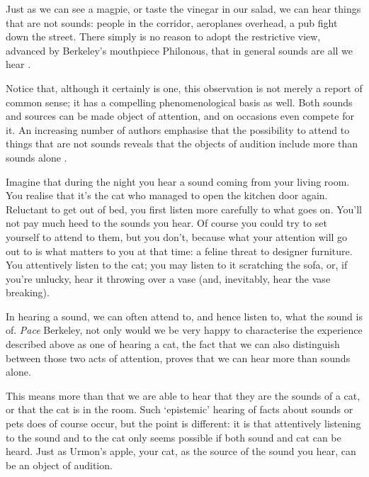 \documentclass[sloppy, journal, git, bytitle, dodraft]{humapap}
\begin{document}
Just as we can see a magpie, or taste the vinegar in our salad, we can
hear things that are not sounds: people in the corridor, aeroplanes
overhead, a pub fight down the street. There simply is no reason to
adopt the restrictive view, advanced by Berkeley's mouthpiece Philonous,
that in general sounds are all we hear \autocite{berkeley1954aa}.

Notice that, although it certainly is one, this observation is not
merely a report of common sense; it has a compelling phenomenological
basis as well. Both sounds and sources can be made object of attention,
and on occasions even compete for it. An increasing number of authors
emphasise that the possibility to attend to things that are not sounds
reveals that the objects of audition include more than sounds alone
\autocite[See:][]{ocallaghan2009aa}.

Imagine that during the night you hear a sound coming from your living
room. You realise that it's the cat who managed to open the kitchen door
again. Reluctant to get out of bed, you first listen more carefully to
what goes on. You'll not pay much heed to the sounds you hear. Of course
you could try to set yourself to attend to them, but you don't, because
what your attention will go out to is what matters to you at that time:
a feline threat to designer furniture. You attentively listen to the
cat; you may listen to it scratching the sofa, or, if you're unlucky,
hear it throwing over a vase (and, inevitably, hear the vase breaking).

In hearing a sound, we can often attend to, and hence listen to, what
the sound is of. \emph{Pace} Berkeley, not only would we be very happy
to characterise the experience described above as one of hearing a cat,
the fact that we can also distinguish between those two acts of
attention, proves that we can hear more than sounds alone.

This means more than that we are able to hear that they are the sounds
of a cat, or that the cat is in the room. Such `epistemic' hearing of
facts about sounds or pets does of course occur, but the point is
different: it is that attentively listening to the sound and to the cat
only seems possible if both sound and cat can be heard. Just as Urmon's
apple, your cat, as the source of the sound you hear, can be an object
of audition.
\end{document}

